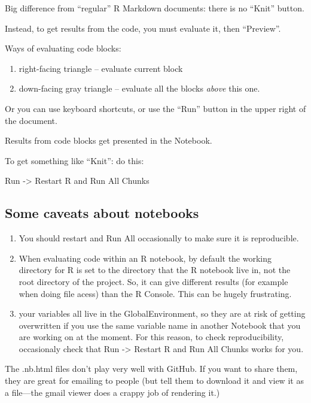 \documentclass[]{book}
\providecommand{\tightlist}{%
  \setlength{\itemsep}{0pt}\setlength{\parskip}{0pt}}
\theoremstyle{definition}
\theoremstyle{definition}
\theoremstyle{remark}
\begin{document}
Big difference from ``regular'' R Markdown documents: there is no
``Knit'' button.

Instead, to get results from the code, you must evaluate it, then
``Preview''.

Ways of evaluating code blocks:

\begin{enumerate}
\def\labelenumi{\arabic{enumi}.}
\tightlist
\item
  right-facing triangle -- evaluate current block
\item
  down-facing gray triangle -- evaluate all the blocks \emph{above} this
  one.
\end{enumerate}

Or you can use keyboard shortcuts, or use the ``Run'' button in the
upper right of the document.

Results from code blocks get presented in the Notebook.

To get something like ``Knit'': do this:

Run -\textgreater{} Restart R and Run All Chunks

\subsection{Some caveats about
notebooks}\label{some-caveats-about-notebooks}

\begin{enumerate}
\def\labelenumi{\arabic{enumi}.}
\tightlist
\item
  You should restart and Run All occasionally to make sure it is
  reproducible.
\item
  When evaluating code within an R notebook, by default the working
  directory for R is set to the directory that the R notebook live in,
  not the root directory of the project. So, it can give different
  results (for example when doing file acess) than the R Console. This
  can be hugely frustrating.
\item
  your variables all live in the GlobalEnvironment, so they are at risk
  of getting overwritten if you use the same variable name in another
  Notebook that you are working on at the moment. For this reason, to
  check reproducibility, occasionaly check that Run -\textgreater{}
  Restart R and Run All Chunks works for you.
\end{enumerate}

The .nb.html files don't play very well with GitHub. If you want to
share them, they are great for emailing to people (but tell them to
download it and view it as a file---the gmail viewer does a crappy job
of rendering it.)
\end{document}
